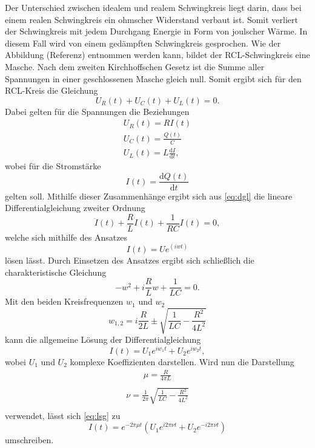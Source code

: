 Der Unterschied zwischen idealem und realem Schwingkreis liegt darin, dass bei einem realen 
Schwingkreis ein ohmscher Widerstand verbaut ist. Somit verliert der Schwingkreis mit jedem 
Durchgang Energie in Form von joulscher Wärme. In diesem Fall wird von einem gedämpften Schwingkreis
gesprochen.
Wie der Abbildung (Referenz) entnommen werden kann, bildet der RCL-Schwingkreis eine Masche. Nach
dem zweiten Kirchhoffschen Gesetz ist die Summe aller Spannungen in einer geschlossenen Masche 
gleich null.
Somit ergibt sich für den RCL-Kreis die Gleichung
\begin{equation}
    U_R(t)+U_C(t)+U_L(t) = 0.
    \label{eq:dgl}
\end{equation}
Dabei gelten für die Spannungen die Beziehungen
\begin{align}
    U_R(t) = R I(t) \\ 
    U_C(t) = \frac{Q(t)}{C} \\ 
    U_L(t) = L \frac{\mathrm{d}I}{\mathrm{d}t},
\end{align}
\noindent
wobei für die Stromstärke 
\begin{equation}
    I(t) = \frac{\mathrm{d}Q(t)}{\mathrm{d}t}
\end{equation}
\noindent
gelten soll.
Mithilfe dieser Zusammenhänge ergibt sich aus \ref{eq:dgl} die lineare Differentialgleichung zweiter Ordnung
\begin{equation}
    \ddot{I}(t) + \frac{R}{L}\dot{I}(t) + \frac{1}{RC}I(t) = 0,
\end{equation}
\noindent
welche sich mithilfe des Ansatzes
\begin{equation}
    I(t) = U e^(iwt)
\end{equation}
\noindent 
lösen lässt. Durch Einsetzen des Ansatzes ergibt sich schließlich die charakteristische Gleichung
\begin{equation}
    -w^2 + i\frac{R}{L}w+\frac{1}{LC} = 0.
\end{equation}
\noindent
Mit den beiden Kreisfrequenzen $w_1$ und $w_2$ 
\begin{equation}
    w_{1,2} = i \frac{R}{2L} \pm \sqrt{\frac{1}{LC}-\frac{R^{2}}{4L^{2}}}
\end{equation}
\noindent
kann die allgemeine Lösung der Differentialgleichung 
\begin{equation}
    I(t) = U_1 e^{i w_1 t} + U_2 e^{i w_2 t},
    \label{eq:lsg}
\end{equation}
\noindent
wobei $U_1$ und $U_2$ komplexe Koeffizienten darstellen. Wird nun die Darstellung
\begin{align}
    \mu = \frac{R}{4\pi L} \nonumber \\
\end{align}
\noindent
\begin{align}
    \nu = \frac{1}{2\pi} \sqrt{\frac{1}{LC}-\frac{R^{2}}{4L^{2}}} \nonumber \\
\end{align}
\noindent
verwendet, lässt sich \ref{eq:lsg} zu
\begin{equation}
    I(t) = e^{-2\pi \mu t} \left( U_1 e^{i 2 \pi \nu t} + U_2 e^{-i 2 \pi \nu t} \right)
\end{equation}
\noindent
umschreiben.





\cite{sample}
